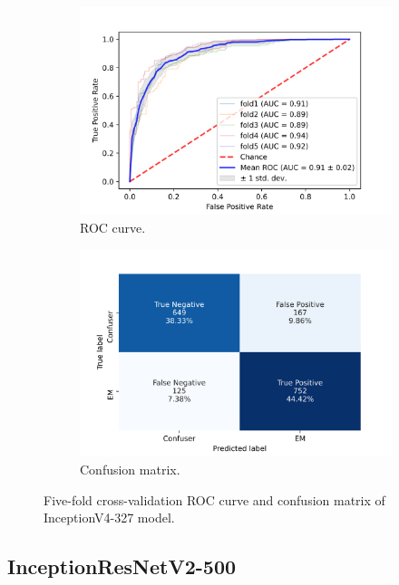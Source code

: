 \begin{figure}[h!]
	\centering
	\begin{subfigure}[b]{0.49\textwidth}
		\centering
		\includegraphics[width=\textwidth,keepaspectratio]{images/Supplement4/image103.png}
		\caption{ROC curve.}
	\end{subfigure}
	\hfill
	\begin{subfigure}[b]{0.49\textwidth}
		\centering
		\includegraphics[width=\textwidth,keepaspectratio]{images/Supplement4/image109.png}
		\caption{Confusion matrix.}
	\end{subfigure}
	\caption{Five-fold cross-validation ROC curve and confusion matrix of InceptionV4-327 model.}
\end{figure}

\vfill\clearpage
\subsection{InceptionResNetV2-500}


